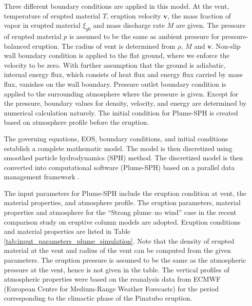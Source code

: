 \documentclass[utf8]{frontiersSCNS} %
\begin{document}
Three different boundary conditions are applied in this model. At the vent, temperature of erupted material $T$, eruption velocity $\textbf{v}$, the mass fraction of vapor in erupted material $\xi_{g0}$ and mass discharge rate $\dot M$ are given. The pressure of erupted material $p$ is assumed to be the same as ambient pressure for pressure-balanced eruption. The radius of vent is determined from $\rho$, $\dot M$ and $\textbf{v}$.  Non-slip wall boundary condition is applied to the flat ground, where we enforce the velocity to be zero. With further assumption that the ground is adiabatic, internal energy flux, which consists of heat flux and energy flux carried by mass flux, vanishes on the wall boundary. Pressure outlet boundary condition is applied to the surrounding atmosphere where the pressure is given. Except for the pressure,  boundary values for density, velocity, and energy are determined by numerical calculation naturely. The initial condition for Plume-SPH is created based on atmosphere profile before the eruption. 

The governing equations,  EOS, boundary conditions, and initial conditions establish a complete mathematic model. The model is then discretized using smoothed particle hydrodynamics (SPH) method. The discretized model is then converted into computational software (Plume-SPH) based on a parallel data management framework \citep{cao2017data}.

The input parameters for Plume-SPH include the eruption condition at vent, the material properties, and atmosphere profile. The eruption parameters, material properties and atmosphere for the ``Strong plume--no wind'' case in the recent comparison study on eruptive column models \citep {costa2016results} are adopted. Eruption conditions and material properties are listed in Table \ref{tab:input_parameters_plume_simulation}. Note that the density of erupted material at the vent and radius of the vent can be computed from the given parameters. The eruption pressure is assumed to be the same as the atmospheric pressure at the vent, hence is not given in the table. The vertical profiles of atmospheric properties were  based on the reanalysis data from ECMWF (European Centre for Medium-Range Weather Forecasts) for the period corresponding to the climactic phase of the Pinatubo eruption. 
\end{document}
